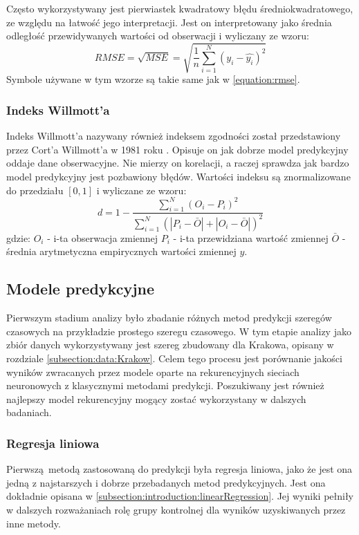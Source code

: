 \documentclass[10pt,a4paper]{article}
\begin{document}
Często wykorzystywany jest pierwiastek kwadratowy błędu średniokwadratowego, ze względu na łatwość jego interpretacji. Jest on interpretowany jako średnia odległość przewidywanych wartości od obserwacji i wyliczany ze wzoru:
\begin{equation}
	RMSE = \sqrt{MSE} = \sqrt{\frac{1}{n}\sum_{i=1}^{N}(y_i - \hat{y_i})^2}
\end{equation}
Symbole używane w tym wzorze są takie same jak w \autoref{equation:rmse}.

\subsubsection{Indeks Willmott'a}
Indeks Willmott'a nazywany również indeksem zgodności został przedstawiony przez Cort'a Willmott'a w 1981 roku \cite{doi:10.1080/02723646.1981.10642213}. Opisuje on jak dobrze model predykcyjny oddaje dane obserwacyjne. Nie mierzy on korelacji, a raczej sprawdza jak bardzo model predykcyjny jest pozbawiony błędów. Wartości indeksu są znormalizowane do przedziału $[0, 1]$ i wyliczane ze wzoru:
\begin{equation}
	d = 1 - \frac{\sum_{i=1}^N (O_i - P_i)^2}{\sum_{i=1}^{N}(|P_i - \bar{O}| + |O_i - \bar{O}|)^2}
\end{equation}
gdzie:\newline
$O_i$ - i-ta obserwacja zmiennej \newline
$P_i$ - i-ta przewidziana wartość zmiennej \newline
$\bar{O}$ - średnia arytmetyczna empirycznych wartości zmiennej $y$.

\subsection{Modele predykcyjne}
Pierwszym stadium analizy było zbadanie różnych metod predykcji szeregów czasowych na przykładzie prostego szeregu czasowego. W tym etapie analizy jako zbiór danych wykorzystywany jest szereg zbudowany dla Krakowa, opisany w rozdziale \autoref{subsection:data:Krakow}. Celem tego procesu jest porównanie jakości wyników zwracanych przez modele oparte na rekurencyjnych sieciach neuronowych z klasycznymi metodami predykcji. Poszukiwany jest również najlepszy model rekurencyjny mogący zostać wykorzystany w dalszych badaniach. 

\subsubsection{Regresja liniowa}
Pierwszą metodą zastosowaną do predykcji była regresja liniowa, jako że jest ona jedną z najstarszych i dobrze przebadanych metod predykcyjnych. Jest ona dokładnie opisana w \autoref{subsection:introduction:linearRegression}. Jej wyniki pełniły w dalszych rozważaniach rolę grupy kontrolnej dla wyników uzyskiwanych przez inne metody.
\end{document}
